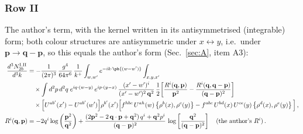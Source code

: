 \subsubsection*{Row II}
The author's term, with the kernel written in its antisymmetrised (integrable) form; both colour structures are antisymmetric under $x\leftrightarrow y$, i.e.\ under $\mathbf{p}\to\mathbf{q}-\mathbf{p}$, so this equals the author's form (Sec.~\ref{sec:A}, item A3):
\begin{align}
\frac{d^{3}N^{\rm I.II}_{2b}}{d^{3}k} & = -\frac{1}{(2\pi)^{3}}\,\frac{g^{4}}{64\pi^{6}}\,\frac{1}{k^{+}}\int_{w,w'}e^{-ik\cdot\ph{(w-w')}}\int_{x,y,x'}\notag\\
&\quad\times\int d^{2}p\,d^{2}q\;e^{iq\cdot(w-y)}\,e^{ip\cdot(y-x)}\,\frac{(x'-w')^{i}}{(x'-w')^{2}\,\mathbf{q}^{2}}\,\frac{1}{2}\bigg[\frac{R^{i}(\mathbf{q},\mathbf{p})}{\mathbf{p}^{2}}-\frac{R^{i}(\mathbf{q},\mathbf{q}-\mathbf{p})}{(\mathbf{q}-\mathbf{p})^{2}}\bigg]\notag\\
&\quad\times\Big[U^{ab'}(x')-U^{ab'}(w')\Big]\rho^{b'}(x')\Big[f^{hbc}\,U^{ah}(w)\left\{\rho^{b}(x),\rho^{c}(y)\right\}-f^{abc}\,U^{bd}(x)\,U^{ce}(y)\left\{\rho^{d}(x),\rho^{e}(y)\right\}\Big]\,,\label{eq:B-I2b}\\
R^{i}(\mathbf{q},\mathbf{p}) & = -2q^{i}\log\left(\frac{\mathbf{p}^{2}}{\mathbf{q}^{2}}\right)+\frac{(2\mathbf{p}^{2}-2\,\mathbf{q}\cdot\mathbf{p}+\mathbf{q}^{2})\,q^{i}+\mathbf{q}^{2}p^{i}}{(\mathbf{q}-\mathbf{p})^{2}}\,\log\left[\frac{\mathbf{q}^{2}}{(\mathbf{q}-\mathbf{p})^{2}}\right]\quad\text{(the author's $R^{i}$)}\,.\notag
\end{align}
